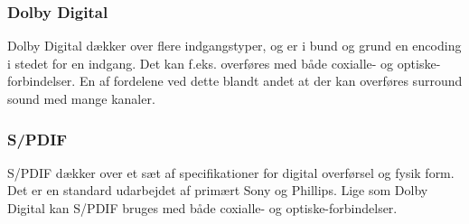 \subsubsection{Dolby Digital}
Dolby Digital dækker over flere indgangstyper, og er i bund og grund en encoding i stedet for en indgang. Det kan f.eks. overføres med både coxialle- og optiske-forbindelser. En af fordelene ved dette blandt andet at der kan overføres surround sound med mange kanaler. 

\subsubsection{S/PDIF}
S/PDIF dækker over et sæt af specifikationer for digital overførsel og fysik form. Det er en standard udarbejdet af primært Sony og Phillips. Lige som Dolby Digital kan S/PDIF bruges med både coxialle- og optiske-forbindelser.